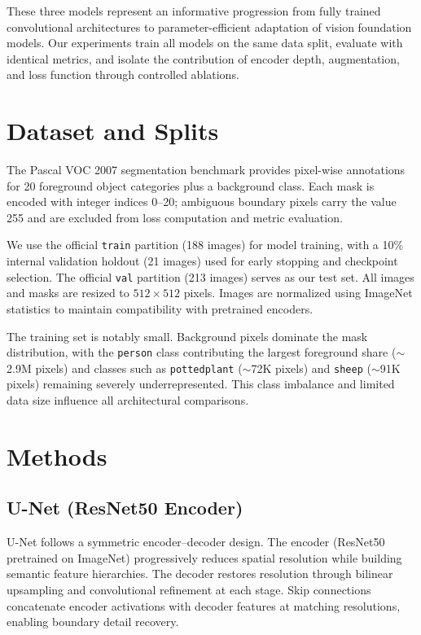 \documentclass[11pt]{article}
\begin{document}
These three models represent an informative progression from fully trained convolutional architectures to parameter-efficient adaptation of vision foundation models. Our experiments train all models on the same data split, evaluate with identical metrics, and isolate the contribution of encoder depth, augmentation, and loss function through controlled ablations.

\section{Dataset and Splits}

The Pascal VOC 2007 segmentation benchmark provides pixel-wise annotations for 20 foreground object categories plus a background class. Each mask is encoded with integer indices 0--20; ambiguous boundary pixels carry the value 255 and are excluded from loss computation and metric evaluation.

We use the official \texttt{train} partition (188 images) for model training, with a 10\% internal validation holdout (21 images) used for early stopping and checkpoint selection. The official \texttt{val} partition (213 images) serves as our test set. All images and masks are resized to $512 \times 512$ pixels. Images are normalized using ImageNet statistics to maintain compatibility with pretrained encoders.

The training set is notably small. Background pixels dominate the mask distribution, with the \texttt{person} class contributing the largest foreground share ($\sim$2.9M pixels) and classes such as \texttt{pottedplant} ($\sim$72K pixels) and \texttt{sheep} ($\sim$91K pixels) remaining severely underrepresented. This class imbalance and limited data size influence all architectural comparisons.

\section{Methods}

\subsection{U-Net (ResNet50 Encoder)}

U-Net follows a symmetric encoder--decoder design. The encoder (ResNet50 pretrained on ImageNet) progressively reduces spatial resolution while building semantic feature hierarchies. The decoder restores resolution through bilinear upsampling and convolutional refinement at each stage. Skip connections concatenate encoder activations with decoder features at matching resolutions, enabling boundary detail recovery.
\end{document}
